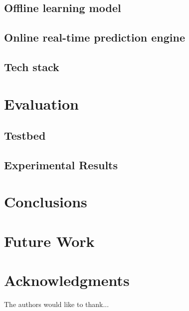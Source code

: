 \documentclass[conference]{IEEEtran}
\begin{document}
\subsection{Offline learning model}

\subsection{Online real-time prediction engine}

\subsection{Tech stack}


\section{Evaluation}

\subsection{Testbed}

\subsection{Experimental Results}


\section{Conclusions}


\section{Future Work}


\section{Acknowledgments}
The authors would like to thank...




\end{document}
